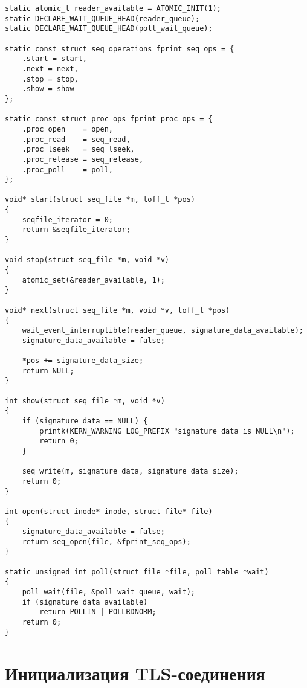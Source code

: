 \begin{lstlisting}[caption={функции работы с VFS proc}]
static atomic_t reader_available = ATOMIC_INIT(1);
static DECLARE_WAIT_QUEUE_HEAD(reader_queue);
static DECLARE_WAIT_QUEUE_HEAD(poll_wait_queue);

static const struct seq_operations fprint_seq_ops = {
    .start = start,
    .next = next,
    .stop = stop,
    .show = show
};

static const struct proc_ops fprint_proc_ops = {
    .proc_open    = open,
    .proc_read    = seq_read,
    .proc_lseek   = seq_lseek,
    .proc_release = seq_release,
    .proc_poll    = poll,
};

void* start(struct seq_file *m, loff_t *pos)
{
    seqfile_iterator = 0;
    return &seqfile_iterator;
}

void stop(struct seq_file *m, void *v)
{
    atomic_set(&reader_available, 1);
}

void* next(struct seq_file *m, void *v, loff_t *pos)
{
    wait_event_interruptible(reader_queue, signature_data_available);
    signature_data_available = false;

    *pos += signature_data_size;
    return NULL;
}

int show(struct seq_file *m, void *v)
{
    if (signature_data == NULL) {
        printk(KERN_WARNING LOG_PREFIX "signature data is NULL\n");
        return 0;
    }

    seq_write(m, signature_data, signature_data_size);
    return 0;
}

int open(struct inode* inode, struct file* file)
{
    signature_data_available = false;
    return seq_open(file, &fprint_seq_ops);
}

static unsigned int poll(struct file *file, poll_table *wait)
{
    poll_wait(file, &poll_wait_queue, wait);
    if (signature_data_available)
        return POLLIN | POLLRDNORM;
    return 0;
}
\end{lstlisting}

\section{Инициализация TLS-соединения}

